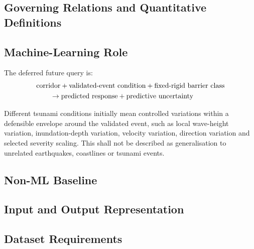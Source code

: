 \subsection{Governing Relations and Quantitative Definitions}
\label{sec:res-ml-sur-governing-relations}

%

\subsection{Machine-Learning Role}
\label{sec:res-ml-sur-machine-learning-role}

The deferred future query is:
\begin{align}
  &\text{corridor}
  + \text{validated-event condition}
  + \text{fixed-rigid barrier class}
  \notag\\
  &\qquad \rightarrow
  \text{predicted response}
  + \text{predictive uncertainty}
  \label{eq:res-ml-sur-query}
\end{align}

Different tsunami conditions initially mean controlled variations within a
defensible envelope around the validated event, such as local wave-height
variation, inundation-depth variation, velocity variation, direction variation
and selected severity scaling. This shall not be described as generalisation to
unrelated earthquakes, coastlines or tsunami events.

\subsection{Non-ML Baseline}
\label{sec:res-ml-sur-non-ml-baseline}


\subsection{Input and Output Representation}
\label{sec:res-ml-sur-input-output-representation}


\subsection{Dataset Requirements}
\label{sec:res-ml-sur-dataset-requirements}

